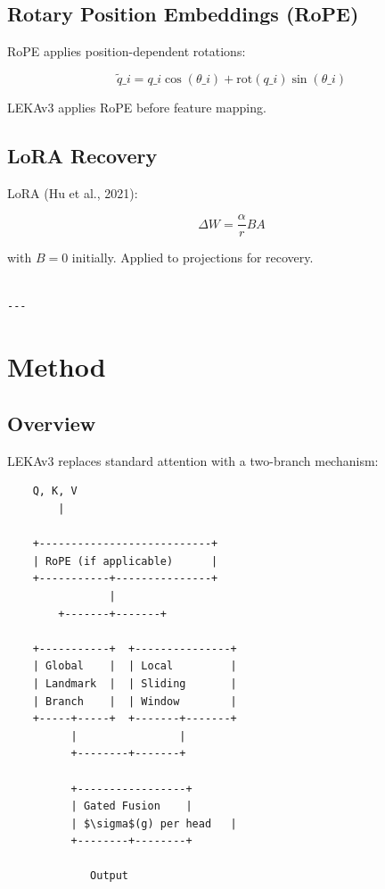 \subsection{Rotary Position Embeddings (RoPE)}

RoPE applies position-dependent rotations:

\[
\tilde{q}\_i = q\_i \cos(\theta\_i) + \text{rot}(q\_i) \sin(\theta\_i)
\tag{3.11}
\]

LEKAv3 applies RoPE before feature mapping.

\subsection{LoRA Recovery}

LoRA (Hu et al., 2021):

\[
\Delta W = \frac{\alpha}{r} B A
\tag{3.12}
\]

with $B = 0$ initially. Applied to projections for recovery.
\begin{lstlisting}

---
\end{lstlisting}

\section{Method}

\subsection{Overview}

LEKAv3 replaces standard attention with a two-branch mechanism:

\begin{lstlisting}
    Q, K, V
        |
         
    +---------------------------+
    | RoPE (if applicable)      |
    +-----------+---------------+
                |
        +-------+-------+
                         
    +-----------+  +---------------+
    | Global    |  | Local         |
    | Landmark  |  | Sliding       |
    | Branch    |  | Window        |
    +-----+-----+  +-------+-------+
          |                |
          +--------+-------+
                    
          +-----------------+
          | Gated Fusion    |
          | $\sigma$(g) per head   |
          +--------+--------+
                    
             Output
\end{lstlisting}


